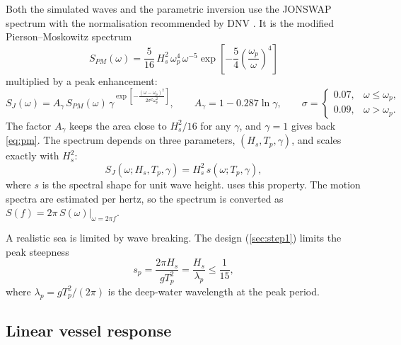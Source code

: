 \documentclass[11pt,a4paper]{article}
\newcommand{\Hs}{H_{s}}
\newcommand{\Tp}{T_{p}}
\begin{document}
Both the simulated waves and the parametric inversion use the JONSWAP
spectrum \citep{hasselmann1973} with the normalisation recommended by
DNV \citep{dnv2021c205}. It is the modified Pierson--Moskowitz spectrum
\begin{equation}
  S_{PM}(\omega) = \frac{5}{16}\, \Hs^2\, \omega_p^4\, \omega^{-5}
                   \exp\!\left[-\frac{5}{4}\left(\frac{\omega_p}{\omega}\right)^{4}\right]
  \label{eq:pm}
\end{equation}
multiplied by a peak enhancement:
\begin{equation}
  S_J(\omega) = A_\gamma\, S_{PM}(\omega)\,
                \gamma^{\exp\left[-\frac{(\omega-\omega_p)^2}{2\sigma^2\omega_p^2}\right]},
  \qquad
  A_\gamma = 1 - 0.287\ln\gamma,
  \qquad
  \sigma =
  \begin{cases}
    0.07, & \omega \le \omega_p,\\
    0.09, & \omega > \omega_p.
  \end{cases}
  \label{eq:jonswap}
\end{equation}
The factor $A_\gamma$ keeps the area close to $\Hs^2/16$ for any $\gamma$, and $\gamma = 1$ gives
back \cref{eq:pm}. The spectrum depends on three parameters, $(\Hs, \Tp, \gamma)$, and scales
exactly with $\Hs^2$:
\begin{equation}
  S_J(\omega; \Hs, \Tp, \gamma) = \Hs^2\, s(\omega; \Tp, \gamma),
  \label{eq:hs_scaling}
\end{equation}
where $s$ is the spectral shape for unit wave height.  uses this property.
The motion spectra are estimated per hertz, so the spectrum is converted as
$S(f) = 2\pi\, S(\omega)\big|_{\omega = 2\pi f}$.

A realistic sea is limited by wave breaking. The design (\cref{sec:step1}) limits the
peak steepness
\begin{equation}
  s_p = \frac{2\pi \Hs}{g \Tp^2} = \frac{\Hs}{\lambda_p} \le \frac{1}{15},
  \label{eq:steepness}
\end{equation}
where $\lambda_p = g\Tp^2/(2\pi)$ is the deep-water wavelength at the peak period.

\subsection{Linear vessel response}
\label{sec:rao}
\end{document}
